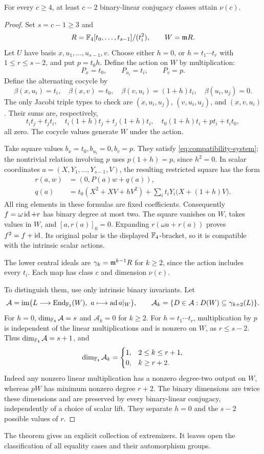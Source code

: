 \begin{theorem}\label{thm:extremizers}
For every \(c\ge4\), at least \(c-2\) binary-linear conjugacy classes
attain \(\nu(c)\).
\end{theorem}
\begin{proof}
Set \(s=c-1\ge3\) and
\[
 R=\mathbb F_4[t_0,\ldots,t_{s-1}]/(t_i^2),\qquad W=\mathfrak m R.
\]
Let \(U\) have basis \(x,u_1,\ldots,u_{s-1},v\).
Choose either \(h=0\), or \(h=t_1\cdots t_r\) with
\(1\le r\le s-2\), and put \(p=t_0h\).
Define the action on \(W\) by multiplication:
\[
 P_x=t_0,\qquad P_{u_i}=t_i,\qquad P_v=p.
\]
Define the alternating cocycle by
\[
 \beta(x,u_i)=t_i,\quad\beta(x,v)=t_0,\quad
 \beta(v,u_i)=(1+h)t_i,\quad\beta(u_i,u_j)=0.
\]
The only Jacobi triple types to check are \((x,u_i,u_j)\),
\((v,u_i,u_j)\), and \((x,v,u_i)\). Their sums are, respectively,
\[
 t_it_j+t_jt_i,\quad
 t_i(1+h)t_j+t_j(1+h)t_i,\quad
 t_0(1+h)t_i+pt_i+t_it_0,
\]
all zero. The cocycle values generate \(W\) under the action.

Take square values \(b_x=t_0,b_{u_i}=0,b_v=p\). They satisfy
\eqref{eq:compatibility-system}; the nontrivial relation involving \(p\)
uses \(p(1+h)=p\), since \(h^2=0\).
In scalar coordinates \(a=(X,Y_1,\ldots,Y_{s-1},V)\), the resulting
restricted square has the form
\begin{align}
 r(a,w)&=(0,P(a)w+q(a)),\label{eq:deformation-square}\\
 q(a)&=t_0(X^2+XV+hV^2)
       +\sum_i t_iY_i\bigl(X+(1+h)V\bigr).
       \label{eq:deformation-q}
\end{align}
All ring elements in these formulas are fixed coefficients. Consequently
\(f=\omega\operatorname{id}+r\) has binary degree at most two.
The square vanishes on \(W\), takes values in \(W\), and
\([a,r(a)]_0=0\). Expanding \(r(\omega a+r(a))\) proves
\(f^2=f+\operatorname{id}\). Its original polar is the displayed \(\mathbb F_4\)-bracket,
so it is compatible with the intrinsic scalar actions.

The lower central ideals are \(\gamma_k=\mathfrak m^{k-1}R\) for \(k\ge2\),
since the action includes every \(t_i\). Each map has class \(c\)
and dimension \(\nu(c)\).

To distinguish them, use only intrinsic binary invariants. Let
\[
 \mathcal A=\operatorname{im}\bigl(L\longrightarrow\operatorname{End}_{\mathbb F_2}(W),\
                   a\longmapsto\operatorname{ad} a|_W\bigr),\qquad
 \mathcal A_k=\{D\in\mathcal A:D(W)\subseteq\gamma_{k+2}(L)\}.
\]
For \(h=0\), \(\dim_{\mathbb F_4}\mathcal A=s\) and
\(\mathcal A_k=0\) for \(k\ge2\).
For \(h=t_1\cdots t_r\), multiplication by \(p\) is independent of
the linear multiplications and is nonzero on \(W\), as \(r\le s-2\).
Thus \(\dim_{\mathbb F_4}\mathcal A=s+1\), and
\[
 \dim_{\mathbb F_4}\mathcal A_k=
 \begin{cases}1,&2\le k\le r+1,\\0,&k\ge r+2.\end{cases}
\]
Indeed any nonzero linear multiplication has a nonzero degree-two
output on \(W\), whereas \(pW\) has minimum nonzero degree \(r+2\).
The binary dimensions are twice these dimensions and are preserved by
every binary-linear conjugacy, independently of a choice of scalar lift.
They separate \(h=0\) and the \(s-2\) possible values of \(r\).
\end{proof}

The theorem gives an explicit collection of extremizers. It leaves open
the classification of all equality cases and their automorphism groups.
